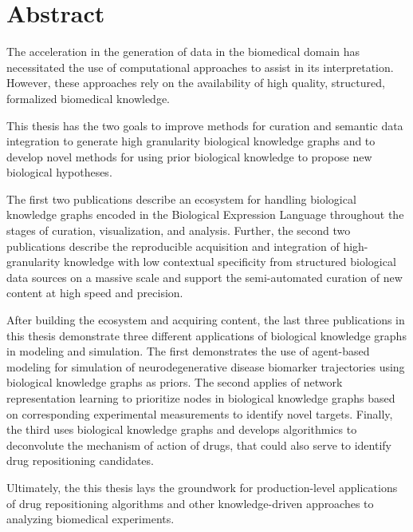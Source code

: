 \chapter*{Abstract}

The acceleration in the generation of data in the biomedical domain has necessitated the use of computational approaches to assist in its interpretation.
However, these approaches rely on the availability of high quality, structured, formalized biomedical knowledge.

This thesis has the two goals to improve methods for curation and semantic data integration to generate high granularity biological knowledge graphs and to develop novel methods for using prior biological knowledge to propose new biological hypotheses.

The first two publications describe an ecosystem for handling biological knowledge graphs encoded in the Biological Expression Language throughout the stages of curation, visualization, and analysis.
Further, the second two publications describe the reproducible acquisition and integration of high-granularity knowledge with low contextual specificity from structured biological data sources on a massive scale and support the semi-automated curation of new content at high speed and precision.

After building the ecosystem and acquiring content, the last three publications in this thesis demonstrate three different applications of biological knowledge graphs in modeling and simulation.
The first demonstrates the use of agent-based modeling for simulation of neurodegenerative disease biomarker trajectories using biological knowledge graphs as priors.
The second applies of network representation learning to prioritize nodes in biological knowledge graphs based on corresponding experimental measurements to identify novel targets.
Finally, the third uses biological knowledge graphs and develops algorithmics to deconvolute the mechanism of action of drugs, that could also serve to identify drug repositioning candidates.

Ultimately, the this thesis lays the groundwork for production-level applications of drug repositioning algorithms and other knowledge-driven approaches to analyzing biomedical experiments.
